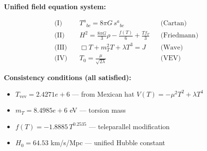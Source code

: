 
\textbf{Unified field equation system:}

\begin{align}
  \text{(I)} \quad & T^a{}_{bc} = 8\pi G \, s^a{}_{bc} && \text{(Cartan)} \\
  \text{(II)} \quad & H^2 = \frac{8\pi G}{3}\rho - \frac{f(T)}{6} + \frac{Tf_T}{3} && \text{(Friedmann)} \\
  \text{(III)} \quad & \Box T + m_T^2 T + \lambda T^3 = J && \text{(Wave)} \\
  \text{(IV)} \quad & T_0 = \frac{\mu}{\sqrt{2\lambda}} && \text{(VEV)}
\end{align}

\textbf{Consistency conditions (all satisfied):}
\begin{itemize}
  \item $T_{\text{vev}} = 2.4271e+6$ — from Mexican hat $V(T) = -\mu^2 T^2 + \lambda T^4$
  \item $m_T = 8.4985e+6$ eV — torsion mass
  \item $f(T) = -1.8885 \, T^{0.2535}$ — teleparallel modification
  \item $H_0 = 64.53$ km/s/Mpc — unified Hubble constant
\end{itemize}